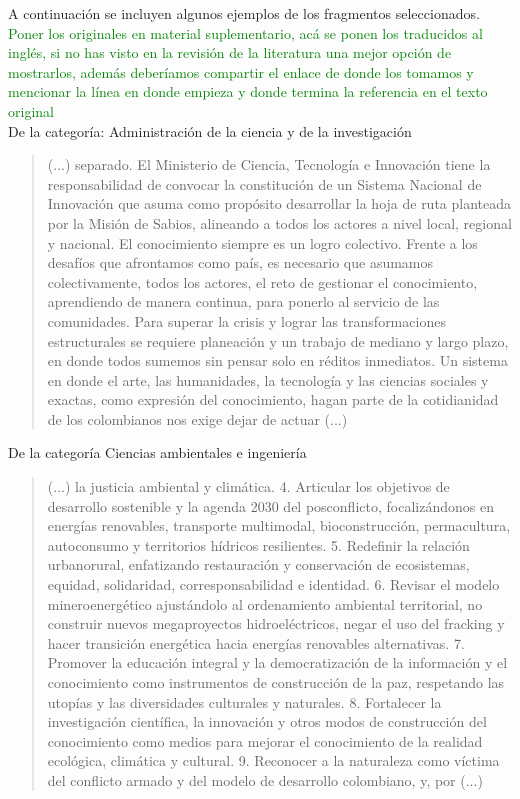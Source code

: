 \documentclass[11pt,a4paper]{article}
\begin{document}
	
	 
	
	A  continuación se incluyen algunos ejemplos de los fragmentos seleccionados. \textcolor{green}{Poner los originales en material suplementario, acá se ponen los traducidos al inglés, si no has visto en la revisión de la literatura una mejor opción de mostrarlos, además deberíamos compartir el enlace de donde los tomamos y mencionar la línea en donde empieza y donde termina la referencia en el texto original}\\
	 
	
	De la categoría: Administración de la ciencia y de la investigación
	
	\begin{quote}
		(...) separado. El Ministerio de Ciencia, Tecnología e Innovación tiene la responsabilidad de convocar la constitución de un Sistema Nacional de Innovación que asuma como propósito desarrollar la hoja de ruta planteada por la Misión de Sabios, alineando a todos los actores a nivel local, regional y nacional. El conocimiento siempre es un logro colectivo. Frente a los desafíos que afrontamos como país, es necesario que asumamos colectivamente, todos los actores, el reto de gestionar el conocimiento, aprendiendo de manera continua, para ponerlo al servicio de las comunidades. Para superar la crisis y lograr las transformaciones estructurales se requiere planeación y un trabajo de mediano y largo plazo, en donde todos sumemos sin pensar solo en réditos inmediatos. Un sistema en donde el arte, las humanidades, la tecnología y las ciencias sociales y exactas, como expresión del conocimiento, hagan parte de la cotidianidad de los colombianos nos exige dejar de actuar (...)
	\end{quote}
	
	De la categoría Ciencias ambientales e ingeniería
	
	\begin{quote}
		(...) la justicia ambiental y climática. 4. Articular los objetivos de desarrollo sostenible y la agenda 2030 del posconflicto, focalizándonos en energías renovables, transporte multimodal, bioconstrucción, permacultura, autoconsumo y territorios hídricos resilientes. 5. Redefinir la relación urbanorural, enfatizando restauración y conservación de ecosistemas, equidad, solidaridad, corresponsabilidad e identidad. 6. Revisar el modelo mineroenergético ajustándolo al ordenamiento ambiental territorial, no construir nuevos megaproyectos hidroeléctricos, negar el uso del fracking y hacer transición energética hacia energías renovables alternativas. 7. Promover la educación integral y la democratización de la información y el conocimiento como instrumentos de construcción de la paz, respetando las utopías y las diversidades culturales y naturales. 8. Fortalecer la investigación científica, la innovación y otros modos de construcción del conocimiento como medios para mejorar el conocimiento de la realidad ecológica, climática y cultural. 9. Reconocer a la naturaleza como víctima del conflicto armado y del modelo de desarrollo colombiano, y, por (...)
	\end{quote}
	
\end{document}
